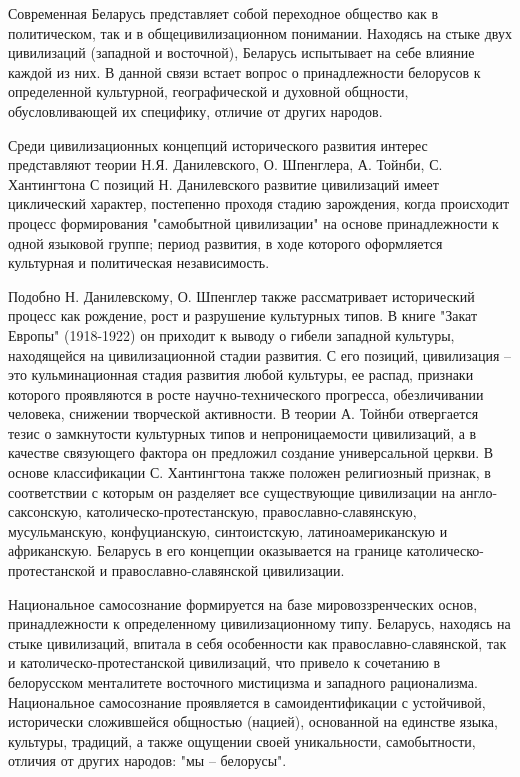 
Современная Беларусь представляет собой переходное общество как в политическом, так и в общецивилизационном понимании. Находясь на стыке двух цивилизаций (западной и восточной), Беларусь испытывает на себе влияние каждой из них. В данной связи встает вопрос о принадлежности белорусов к определенной культурной, географической и духовной общности, обусловливающей их специфику, отличие от других народов.

Среди цивилизационных концепций исторического развития интерес представляют теории Н.Я. Данилевского, О. Шпенглера, А. Тойнби, С. Хантингтона С позиций Н. Данилевского развитие цивилизаций имеет циклический характер, постепенно проходя стадию зарождения, когда происходит процесс формирования "самобытной цивилизации" на основе принадлежности к одной языковой группе; период развития, в ходе которого оформляется культурная и политическая независимость.

Подобно Н. Данилевскому, О. Шпенглер также рассматривает исторический процесс как рождение, рост и разрушение культурных типов. В книге "Закат Европы" (1918-1922) он приходит к выводу о гибели западной культуры, находящейся на цивилизационной стадии развития. С его позиций, цивилизация – это кульминационная стадия развития любой культуры, ее распад, признаки которого проявляются в росте научно-технического прогресса, обезличивании человека, снижении творческой активности. В теории А. Тойнби отвергается тезис о замкнутости культурных типов и непроницаемости цивилизаций, а в качестве связующего фактора он предложил создание универсальной церкви. В основе классификации С. Хантингтона также положен религиозный признак, в соответствии с которым он разделяет все существующие цивилизации на англо-саксонскую, католическо-протестанскую, православно-славянскую, мусульманскую, конфуцианскую, синтоистскую, латиноамериканскую и африканскую. Беларусь в его концепции оказывается на границе католическо-протестанской и православно-славянской цивилизации.

Национальное самосознание формируется на базе мировоззренческих основ, принадлежности к определенному цивилизационному типу. Беларусь, находясь на стыке цивилизаций, впитала в себя особенности как православно-славянской, так и католическо-протестанской цивилизаций, что привело к сочетанию в белорусском менталитете восточного мистицизма и западного рационализма. Национальное самосознание проявляется в самоидентификации с устойчивой, исторически сложившейся общностью (нацией), основанной на единстве языка, культуры, традиций, а также ощущении своей уникальности, самобытности, отличия от других народов: "мы – белорусы".
